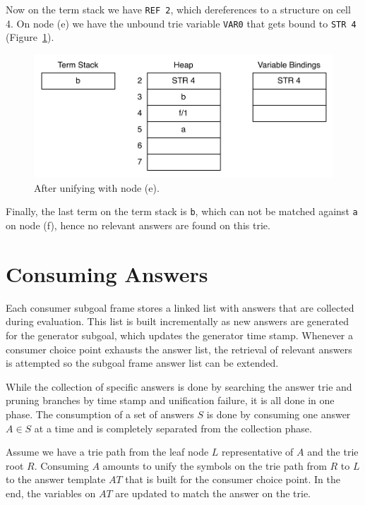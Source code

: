 Now on the term stack we have \texttt{REF 2}, which dereferences to
a structure on cell 4. On node (e) we have the unbound trie variable
\texttt{VAR0} that gets bound to \texttt{STR 4} (Figure~\ref{fig:collect_variable4}).

\begin{figure}[H]
  \centering
    \includegraphics[scale=0.5]{collect_variable4.pdf}
  \caption{After unifying with node (e).}
  \label{fig:collect_variable4}
\end{figure}

Finally, the last term on the term stack is \texttt{b}, which
can not be matched against \texttt{a} on node (f), hence no
relevant answers are found on this trie.

\section{Consuming Answers}

Each consumer subgoal frame stores a linked list with answers that are collected
during evaluation. This list is built incrementally as new answers are generated
for the generator subgoal, which updates the generator time stamp.
Whenever a consumer choice point exhausts the answer list, the retrieval
of relevant answers is attempted so the subgoal frame answer list can be extended.

While the collection of specific answers is done by searching the answer trie
and pruning branches by time stamp and unification failure, it is all done in one
phase. The consumption of a set of answers $S$ is done by consuming one answer $A \in S$
at a time and is completely separated from the collection phase.

Assume we have a trie path from the leaf node $L$ representative of $A$ and
the trie root $R$. Consuming $A$ amounts to unify the symbols on the trie path from $R$ to $L$
to the answer template $AT$ that is built for the consumer choice point. In the end, the variables
on $AT$ are updated to match the answer on the trie.

